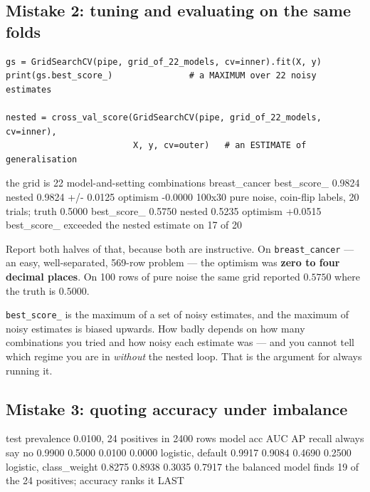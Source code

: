 \documentclass[11pt]{article}
\begin{document}
\subsection{Mistake 2: tuning and evaluating on the same folds}
\label{sec:m2}

\begin{lstlisting}
gs = GridSearchCV(pipe, grid_of_22_models, cv=inner).fit(X, y)
print(gs.best_score_)               # a MAXIMUM over 22 noisy estimates

nested = cross_val_score(GridSearchCV(pipe, grid_of_22_models, cv=inner),
                         X, y, cv=outer)   # an ESTIMATE of generalisation
\end{lstlisting}
\begin{codeout}
the grid is 22 model-and-setting combinations
breast_cancer   best_score_ 0.9824   nested 0.9824 +/- 0.0125
                optimism    -0.0000
100x30 pure noise, coin-flip labels, 20 trials; truth 0.5000
  best_score_ 0.5750   nested 0.5235   optimism +0.0515
  best_score_ exceeded the nested estimate on 17 of 20
\end{codeout}

Report both halves of that, because both are instructive. On
\texttt{breast\_cancer} --- an easy, well-separated, 569-row problem --- the
optimism was \textbf{zero to four decimal places}. On 100 rows of pure noise
the same grid reported $0.5750$ where the truth is $0.5000$.

\begin{keyidea}
\texttt{best\_score\_} is the maximum of a set of noisy estimates, and the
maximum of noisy estimates is biased upwards. How badly depends on how many
combinations you tried and how noisy each estimate was --- and you cannot
tell which regime you are in \emph{without} the nested loop. That is the
argument for always running it.
\end{keyidea}

\subsection{Mistake 3: quoting accuracy under imbalance}
\label{sec:m3}

\begin{codeout}
test prevalence 0.0100, 24 positives in 2400 rows
model                           acc      AUC       AP   recall
always say no                0.9900   0.5000   0.0100   0.0000
logistic, default            0.9917   0.9084   0.4690   0.2500
logistic, class_weight       0.8275   0.8938   0.3035   0.7917
the balanced model finds 19 of the 24 positives; accuracy ranks it LAST
\end{codeout}
\end{document}
